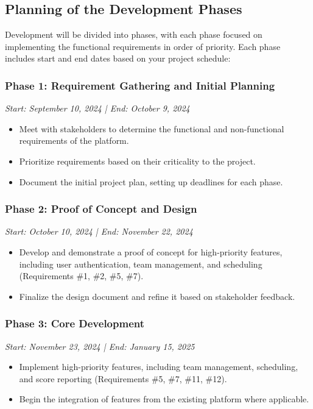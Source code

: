 \documentclass[12pt]{article}
\begin{document}
\subsection{Planning of the Development Phases}
Development will be divided into phases, with each phase focused on implementing the functional requirements in order of priority. Each phase includes start and end dates based on your project schedule:

\subsubsection{Phase 1: Requirement Gathering and Initial Planning}
\textit{Start: September 10, 2024 | End: October 9, 2024}
\begin{itemize}
    \item Meet with stakeholders to determine the functional and non-functional requirements of the platform.
    \item Prioritize requirements based on their criticality to the project.
    \item Document the initial project plan, setting up deadlines for each phase.
\end{itemize}

\subsubsection{Phase 2: Proof of Concept and Design}
\textit{Start: October 10, 2024 | End: November 22, 2024}
\begin{itemize}
    \item Develop and demonstrate a proof of concept for high-priority features, including user authentication, team management, and scheduling (Requirements \#1, \#2, \#5, \#7).
    \item Finalize the design document and refine it based on stakeholder feedback.
\end{itemize}

\subsubsection{Phase 3: Core Development}
\textit{Start: November 23, 2024 | End: January 15, 2025}
\begin{itemize}
    \item Implement high-priority features, including team management, scheduling, and score reporting (Requirements \#5, \#7, \#11, \#12).
    \item Begin the integration of features from the existing platform where applicable.
\end{itemize}
\end{document}
